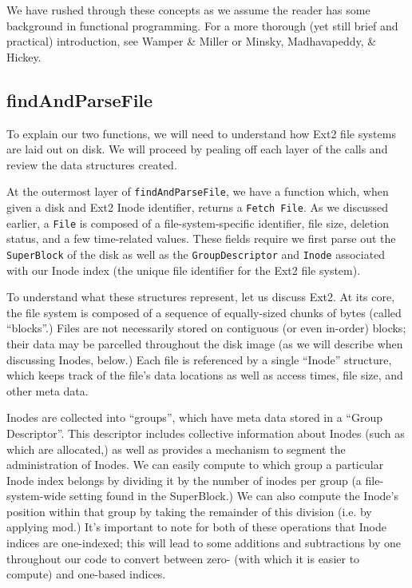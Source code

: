 \documentclass[nocopyrightspace]{sigplanconf}
\begin{document}
We have rushed through these concepts as we assume the reader has some
background in functional programming. For a more thorough (yet still brief and
practical) introduction, see Wamper \& Miller\cite{scala} or Minsky,
Madhavapeddy, \& Hickey\cite{ocaml}.

\subsection{findAndParseFile}

To explain our two functions, we will need to understand how Ext2 file systems
are laid out on disk. We will proceed by pealing off each layer of the calls
and review the data structures created.

At the outermost layer of {\tt findAndParseFile}, we have a function which,
when given a disk and Ext2 Inode identifier, returns a {\tt Fetch File}. As we
discussed earlier, a {\tt File} is composed of a file-system-specific
identifier, file size, deletion status, and a few time-related values.  These
fields require we first parse out the {\tt SuperBlock} of the disk as well as
the {\tt GroupDescriptor} and {\tt Inode} associated with our Inode index (the
unique file identifier for the Ext2 file system).

To understand what these structures represent, let us discuss Ext2. At its
core, the file system is composed of a sequence of equally-sized chunks of
bytes (called ``blocks''.) Files are not necessarily stored on contiguous (or
even in-order) blocks; their data may be parcelled throughout the disk image
(as we will describe when discussing Inodes, below.) Each file is referenced
by a single ``Inode'' structure, which keeps track of the file's data
locations as well as access times, file size, and other meta data. 

Inodes are collected into ``groups'', which have meta data stored in a ``Group
Descriptor''. This descriptor includes collective information about Inodes
(such as which are allocated,) as well as provides a mechanism to segment the
administration of Inodes. We can easily compute to which group a particular
Inode index belongs by dividing it by the number of inodes per group (a
file-system-wide setting found in the SuperBlock.) We can also compute the
Inode's position within that group by taking the remainder of this division
(i.e. by applying mod.) It's important to note for both of these operations
that Inode indices are one-indexed; this will lead to some additions and
subtractions by one throughout our code to convert between zero- (with which
it is easier to compute) and one-based indices.
\end{document}
